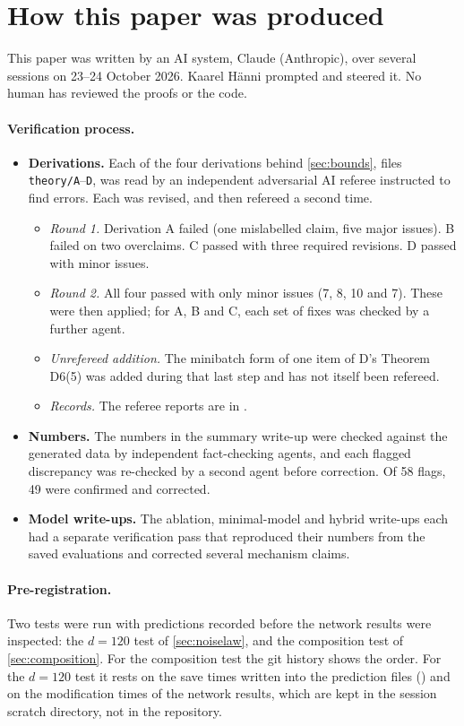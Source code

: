 \section{How this paper was produced}\label{app:provenance}

This paper was written by an AI system, Claude (Anthropic), over several sessions on 23–24 October 2026. Kaarel H\"anni prompted and steered it. No human has reviewed the proofs or the code.

\paragraph{Verification process.}
\begin{itemize}
\item \textbf{Derivations.} Each of the four derivations behind \cref{sec:bounds}, files \texttt{theory/A}–\texttt{D}, was read by an independent adversarial AI referee instructed to find errors. Each was revised, and then refereed a second time.
  \begin{itemize}
  \item \emph{Round 1.} Derivation A failed (one mislabelled claim, five major issues). B failed on two overclaims. C passed with three required revisions. D passed with minor issues.
  \item \emph{Round 2.} All four passed with only minor issues (7, 8, 10 and 7). These were then applied; for A, B and C, each set of fixes was checked by a further agent.
  \item \emph{Unrefereed addition.} The minibatch form of one item of D's Theorem D6(5) was added during that last step and has not itself been refereed.
  \item \emph{Records.} The referee reports are in .
  \end{itemize}
\item \textbf{Numbers.} The numbers in the summary write-up were checked against the generated data by independent fact-checking agents, and each flagged discrepancy was re-checked by a second agent before correction. Of 58 flags, 49 were confirmed and corrected.
\item \textbf{Model write-ups.} The ablation, minimal-model and hybrid write-ups each had a separate verification pass that reproduced their numbers from the saved evaluations and corrected several mechanism claims.
\end{itemize}

\paragraph{Pre-registration.} Two tests were run with predictions recorded before the network results were inspected: the $d=120$ test of \cref{sec:noiselaw}, and the composition test of \cref{sec:composition}. For the composition test the git history shows the order. For the $d=120$ test it rests on the save times written into the prediction files () and on the modification times of the network results, which are kept in the session scratch directory, not in the repository.

